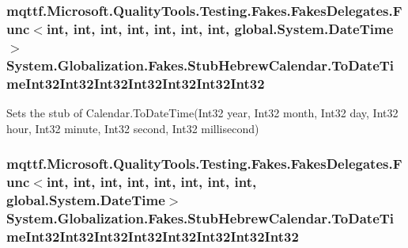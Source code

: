 \hypertarget{class_system_1_1_globalization_1_1_fakes_1_1_stub_hebrew_calendar_aecc9129654fcaf384fbaedb18735bf70}{
\subsubsection[{To\-Date\-Time\-Int32\-Int32\-Int32\-Int32\-Int32\-Int32\-Int32}]{\setlength{\rightskip}{0pt plus 5cm}mqttf.\-Microsoft.\-Quality\-Tools.\-Testing.\-Fakes.\-Fakes\-Delegates.\-Func$<$int, int, int, int, int, int, int, global.\-System.\-Date\-Time$>$ System.\-Globalization.\-Fakes.\-Stub\-Hebrew\-Calendar.\-To\-Date\-Time\-Int32\-Int32\-Int32\-Int32\-Int32\-Int32\-Int32}}\label{class_system_1_1_globalization_1_1_fakes_1_1_stub_hebrew_calendar_aecc9129654fcaf384fbaedb18735bf70}


Sets the stub of Calendar.\-To\-Date\-Time(\-Int32 year, Int32 month, Int32 day, Int32 hour, Int32 minute, Int32 second, Int32 millisecond)

\hypertarget{class_system_1_1_globalization_1_1_fakes_1_1_stub_hebrew_calendar_add035a2790291e034719fe9b83f4fb53}{
\subsubsection[{To\-Date\-Time\-Int32\-Int32\-Int32\-Int32\-Int32\-Int32\-Int32\-Int32}]{\setlength{\rightskip}{0pt plus 5cm}mqttf.\-Microsoft.\-Quality\-Tools.\-Testing.\-Fakes.\-Fakes\-Delegates.\-Func$<$int, int, int, int, int, int, int, int, global.\-System.\-Date\-Time$>$ System.\-Globalization.\-Fakes.\-Stub\-Hebrew\-Calendar.\-To\-Date\-Time\-Int32\-Int32\-Int32\-Int32\-Int32\-Int32\-Int32\-Int32}}\label{class_system_1_1_globalization_1_1_fakes_1_1_stub_hebrew_calendar_add035a2790291e034719fe9b83f4fb53}


